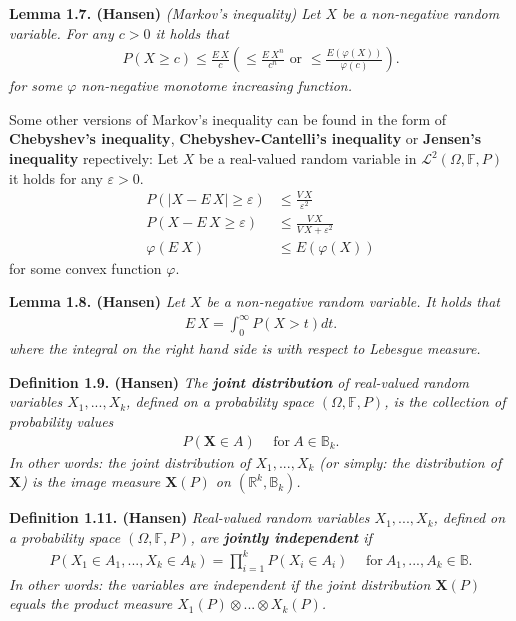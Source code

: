 \documentclass[a4paper,12pt,openany]{book}
\begin{document}
\textbf{Lemma 1.7. (Hansen)} \emph{(Markov's inequality) Let \(X\) be a non-negative random variable. For any \(c>0\) it holds that}
\begin{align*}
    P(X\ge c)\le \frac{E\, X}{c}\left(\le \frac{E\ X^n}{c^n}\text{ or }\le \frac{E\left(\varphi(X)\right)}{\varphi(c)}\right).\tag{1.14}
\end{align*}
\emph{for some \(\varphi\) non-negative monotome increasing function.}

Some other versions of Markov's inequality can be found in the form of \textbf{Chebyshev's inequality}, \textbf{Chebyshev-Cantelli's inequality} or \textbf{Jensen's inequality} repectively: Let \(X\) be a real-valued random variable in \(\mathcal{L}^2(\Omega,\mathbb{F},P)\) it holds for any \(\varepsilon>0\).
\begin{align*}
    P\left(\vert X-E\, X\vert \ge \varepsilon\right)&\le \frac{V\, X}{\varepsilon^2}\tag{1.15}\\
    P\left( X-E\, X \ge \varepsilon\right)&\le \frac{V\, X}{V\, X+\varepsilon^2}\tag{prob: 1.13(c)}\\
    \varphi\left(E\ X\right)&\le E\left( \varphi(X)\right)
\end{align*}
for some convex function \(\varphi\).

\textbf{Lemma 1.8. (Hansen)} \emph{Let \(X\) be a non-negative random variable. It holds that}
\begin{align*}
    E\, X=\int_0^\infty P(X>t)dt.\tag{1.16}
\end{align*}
\emph{where the integral on the right hand side is with respect to Lebesgue measure.}

\textbf{Definition 1.9. (Hansen)} \emph{The \textbf{joint distribution} of real-valued random variables \(X_1,...,X_k\), defined on a probability space \((\Omega, \mathbb{F},P)\), is the collection of probability values}
\begin{align*}
    P(\mathbf{X}\in A)\hspace{15pt}\text{for}\ A\in\mathbb{B}_k.\tag{1.21}
\end{align*}
\emph{In other words: the joint distribution of \(X_1,...,X_k\) (or simply: the distribution of \(\mathbf{X}\)) is the image measure \(\mathbf{X}(P)\) on \(\left(\mathbb{R}^k,\mathbb{B}_k\right)\).}

\textbf{Definition 1.11. (Hansen)} \emph{Real-valued random variables \(X_1,...,X_k\), defined on a probability space \((\Omega, \mathbb{F},P)\), are \textbf{jointly independent} if}
\begin{align*}
    P\left(X_1\in A_1,...,X_k\in A_k\right)=\prod_{i=1}^kP(X_i\in A_i)\hspace{15pt}\text{for}\ A_1,...,A_k\in\mathbb{B}.\tag{1.23}
\end{align*}
\emph{In other words: the variables are independent if the joint distribution \(\mathbf{X}(P)\) equals the product measure \(X_1(P)\otimes ... \otimes X_k(P)\).}
\end{document}
